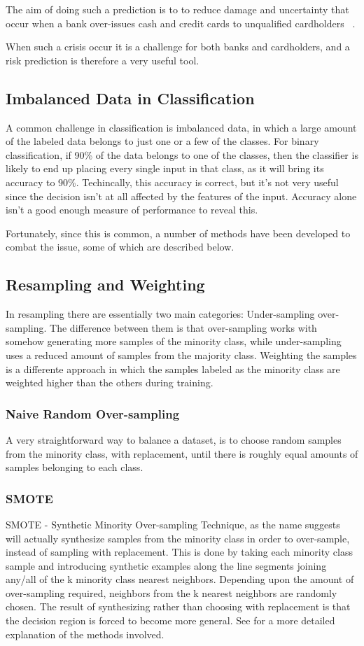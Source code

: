 The aim of doing such a prediction is to to reduce damage and 
uncertainty that occur when a bank over-issues cash and credit 
cards to unqualified cardholders ~\cite{ComparisonData}.

When such a crisis occur it is a challenge for both banks and 
cardholders, and a risk prediction is therefore a very useful tool. 


\subsection{Imbalanced Data in Classification}
A common challenge in classification is imbalanced data, in which a large
amount of the labeled data belongs to just one or a few of the classes.
For binary classification, if 90\% of the data belongs to one of the classes,
then the classifier is likely to end up placing every single
input in that class, as it will bring its accuracy to 90\%. Techincally, this
accuracy is correct, but it's not very useful since the decision isn't at all
affected by the features of the input. Accuracy alone isn't a good enough
measure of performance to reveal this.

Fortunately, since this is common, a number of methods have been developed
to combat the issue, some of which are described below.

\subsection{Resampling and Weighting}
In resampling there are essentially two main categories: Under-sampling
over-sampling. The difference between them is that over-sampling works with
somehow generating more samples of the minority class, while under-sampling
uses a reduced amount of samples from the majority class.
Weighting the samples is a differente approach in which the samples labeled
as the minority class are weighted higher than the others during training.

\subsubsection{Naive Random Over-sampling}
A very straightforward way to balance a dataset, is to choose random samples 
from the minority class, with replacement, until there is roughly equal
amounts of samples belonging to each class.

\subsubsection{SMOTE}
SMOTE - Synthetic Minority Over-sampling Technique, as the name suggests will
actually synthesize samples from the minority class in order to over-sample,
instead of sampling with replacement. This is done by taking each minority 
class sample and introducing synthetic examples along the line segments joining 
any/all of the k minority class nearest neighbors. Depending upon the amount of 
over-sampling required, neighbors from the k nearest neighbors are randomly
chosen. The result of synthesizing rather than choosing with replacement is
that the decision region is forced to become more general.
See \cite{smote-article} for a more detailed explanation of the methods
involved.

